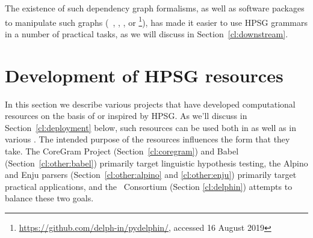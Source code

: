 \documentclass[output=paper,nonflat]{langsci/langscibook}
\begin{document}
The existence of such dependency graph formalisms,
as well as software packages to manipulate such graphs (\eg\ \citealt{ivanova2012dm}, \citealt{copestake2016pydmrs}, \citealt{Her:Kuh:Oep:19}, or \footnote{\url{https://github.com/delph-in/pydelphin/}, accessed 16 August 2019}),
has made it easier to use HPSG grammars in a number of practical tasks,
as we will discuss in Section~\ref{cl:downstream}.








\section{Development of HPSG resources}
\label{cl:resources}

In this section we describe various projects that have developed computational resources on the basis of or inspired by HPSG.
As we'll discuss in Section~\ref{cl:deployment} below,
such resources can be used both in  as well as in various .
The intended purpose of the resources influences the form that they take.
The CoreGram Project (Section~\ref{cl:coregram}) and Babel (Section~\ref{cl:other:babel}) primarily target linguistic hypothesis testing,
the Alpino and Enju parsers (Section~\ref{cl:other:alpino} and \ref{cl:other:enju}) primarily target practical applications,
and the \delphin\ Consortium (Section \ref{cl:delphin}) attempts to balance these two goals.
\end{document}

